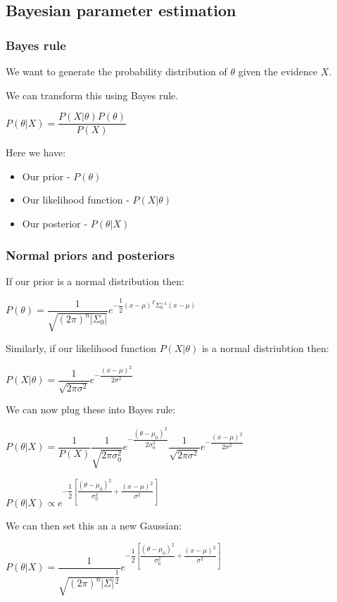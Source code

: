 
\subsection{Bayesian parameter estimation}

\subsubsection{Bayes rule}

We want to generate the probability distribution of \(\theta \) given the evidence \(X\).

We can transform this using Bayes rule.

\(P(\theta | X)=\dfrac{P(X|\theta )P(\theta )}{P(X)}\)

Here we have:

\begin{itemize}
\item Our prior - \(P(\theta )\)
\item Our likelihood function - \(P(X|\theta )\)
\item Our posterior - \(P(\theta | X)\)
\end{itemize}

\subsubsection{ Normal priors and posteriors}

If our prior is a normal distribution then:

\(P(\theta )=\dfrac{1}{\sqrt {(2\pi )^n|\Sigma_0|}}e^{-\dfrac{1}{2}(x-\mu )^T\Sigma_0^{-1}(x-\mu)}\)

Similarly, if our likelihood function \(P(X|\theta )\) is a normal distriubtion then:

\(P(X|\theta )=\dfrac{1}{\sqrt {2\pi \sigma^2}}e^{-\dfrac{(x-\mu)^2}{2\sigma ^2}}\)

We can now plug these into Bayes rule:

\(P(\theta |X)=\dfrac{1}{P(X)}\dfrac{1}{\sqrt {2\pi \sigma_0^2}}e^{-\dfrac{(\theta-\mu_0)^2}{2\sigma_0^2}}\dfrac{1}{\sqrt {2\pi \sigma^2}}e^{-\dfrac{(x-\mu)^2}{2\sigma ^2}}\)

\(P(\theta |X)\propto e^{-\dfrac{1}{2}[\dfrac{(\theta-\mu_0)^2}{\sigma_0^2}+\dfrac{(x-\mu)^2}{\sigma ^2}]}\)

We can then set this an a new Gaussian:

\(P(\theta |X)=\dfrac{1}{\sqrt {(2\pi )^{n}|\Sigma|}^{\dfrac{1}{2}}} e^{-\dfrac{1}{2}[\dfrac{(\theta-\mu_0)^2}{\sigma_0^2}+\dfrac{(x-\mu)^2}{\sigma ^2}]}\)

